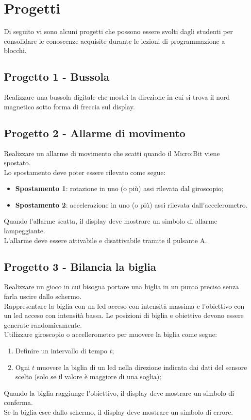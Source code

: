 \documentclass[../../docenti.tex]{subfiles}
\begin{document}
\section{Progetti}
Di seguito vi sono alcuni progetti che possono essere svolti dagli studenti per consolidare le conoscenze acquisite durante le lezioni di programmazione a blocchi.

\subsection{Progetto 1 - Bussola}
Realizzare una bussola digitale che mostri la direzione in cui si trova il nord magnetico sotto forma di freccia sul display.

\subsection{Progetto 2 - Allarme di movimento}
Realizzare un allarme di movimento che scatti quando il Micro:Bit viene spostato.\\
Lo spostamento deve poter essere rilevato come segue:
\begin{itemize}
	\item \textbf{Spostamento 1}: rotazione in uno (o più) assi rilevata dal giroscopio;
	\item \textbf{Spostamento 2}: accelerazione in uno (o più) assi rilevata dall'accelerometro.
\end{itemize}
Quando l'allarme scatta, il display deve mostrare un simbolo di allarme lampeggiante.\\
L'allarme deve essere attivabile e disattivabile tramite il pulsante A.

\subsection{Progetto 3 - Bilancia la biglia}

Realizzare un gioco in cui bisogna portare una biglia in un punto preciso senza farla uscire dallo schermo.\\
Rappresentare la biglia con un led acceso con intensità massima e l'obiettivo con un led acceso con intensità bassa. Le posizioni di biglia e obiettivo devono essere generate randomicamente.\\
Utilizzare giroscopio o accellerometro per muovere la biglia come segue:
\begin{enumerate}
	\item Definire un intervallo di tempo \(t\);
	\item Ogni \(t\) muovere la biglia di un led nella direzione indicata dai dati del sensore scelto (solo se il valore è maggiore di una soglia);
\end{enumerate}
Quando la biglia raggiunge l'obiettivo, il display deve mostrare un simbolo di conferma.\\
Se la biglia esce dallo schermo, il display deve mostrare un simbolo di errore.	
\newpage
\end{document}
